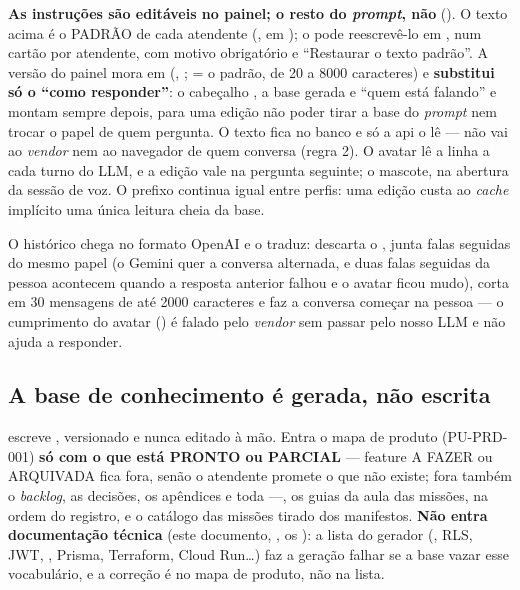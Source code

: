 \begin{decisao}
\textbf{As instruções são editáveis no painel; o resto do \emph{prompt}, não}
(). O texto acima é o PADRÃO de cada atendente
(, em ); o 
pode reescrevê-lo em , num cartão por atendente, com motivo
obrigatório e \enquote{Restaurar o texto padrão}. A versão do painel mora em
 (, ;
 = o padrão, de 20 a \num{8000} caracteres) e \textbf{substitui só o
\enquote{como responder}}: o cabeçalho , a base gerada e
\enquote{quem está falando}  e 
montam sempre depois, para uma edição não poder tirar a base do \emph{prompt}
nem trocar o papel de quem pergunta. O texto fica no banco e só a api o lê ---
não vai ao \emph{vendor} nem ao navegador de quem conversa (regra 2). O avatar
lê a linha a cada turno do LLM, e a edição vale na pergunta seguinte; o mascote,
na abertura da sessão de voz. O prefixo continua igual entre perfis: uma edição
custa ao \emph{cache} implícito uma única leitura cheia da base.
\end{decisao}

O histórico chega no formato OpenAI e  o traduz: descarta o
, junta falas seguidas do mesmo papel (o Gemini quer a conversa
alternada, e duas falas seguidas da pessoa acontecem quando a resposta anterior
falhou e o avatar ficou mudo), corta em 30 mensagens de até \num{2000}
caracteres e faz a conversa começar na pessoa --- o cumprimento do avatar
() é falado pelo \emph{vendor} sem passar pelo nosso LLM e não
ajuda a responder.

\subsection{A base de conhecimento é gerada, não escrita}

 escreve
, versionado e nunca editado à
mão. Entra o mapa de produto (PU-PRD-001) \textbf{só com o que está PRONTO ou
PARCIAL} --- feature A FAZER ou ARQUIVADA fica fora, senão o atendente promete o
que não existe; fora também o \emph{backlog}, as decisões, os apêndices e toda
 ---, os guias da aula das missões, na ordem do
registro, e o catálogo das missões tirado dos manifestos. \textbf{Não entra
documentação técnica} (este documento, , os ): a lista
 do gerador (, RLS, JWT, ,
Prisma, Terraform, Cloud Run\ldots) faz a geração falhar se a base vazar esse
vocabulário, e a correção é no mapa de produto, não na lista.

